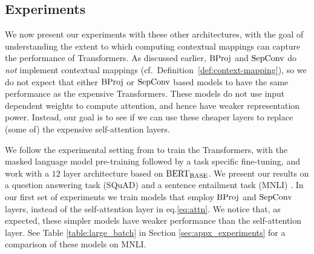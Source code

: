 
\vspace*{-5pt}
\subsection{Experiments}
\vspace*{-3pt}

We now present our experiments with these other architectures, with the goal of understanding the extent to which computing contextual mappings can capture the performance of Transformers. As discussed earlier, ${\rm BProj}$ and ${\rm SepConv}$ do \emph{not} implement contextual mappings (cf.~Definition~\ref{def:context-mapping}), so we do not expect that either ${\rm BProj}$ or ${\rm SepConv}$ based models to have the same performance as the expensive Transformers. These models do not use input dependent weights to compute attention, and hence have weaker representation power. Instead, our goal is to see if we can use these cheaper layers to replace (some of) the expensive self-attention layers.



We follow the experimental setting from \citet{devlin2018bert} to train the Transformers, with the masked language model pre-training followed by a task specific fine-tuning, and work with a $12$ layer architecture based on $\text{BERT}_{\text{BASE}}$. We present our results on a question answering task (SQuAD) \citep{rajpurkar2016squad} and a sentence entailment task (MNLI) \citep{mnli}. In our first set of experiments we train models that employ ${\rm BProj}$ and ${\rm SepConv}$ layers, instead of the self-attention layer in eq.\eqref{eq:attn}. We notice that, as expected, these simpler models have weaker performance than the self-attention layer. See Table \ref{table:large_batch} in Section \ref{sec:appx_experiments} for a comparison of these models on MNLI. 



